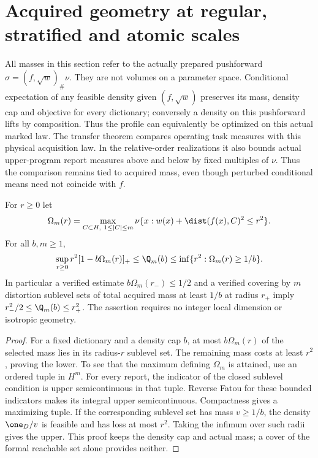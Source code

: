 \section{Acquired geometry at regular, stratified and atomic scales}\label{sec:geometry}
All masses in this section refer to the actually prepared pushforward
$\sigma=(f,\sqrt w)_\#\nu$. They are not volumes on a parameter space. Conditional expectation of any feasible density given $(f,\sqrt w)$ preserves its mass, density cap and objective for every dictionary; conversely a density on this pushforward lifts by composition. Thus the profile can equivalently be optimized on this actual marked law. The transfer theorem compares operating task measures with this physical acquisition law. In the relative-order realizations it also bounds actual upper-program report measures above and below by fixed multiples of $\nu$. Thus the comparison remains tied to acquired mass, even though perturbed conditional means need not coincide with $f$.

\begin{proposition}\label{prop:sublevel}
For $r\ge0$ let
\[
 \Omega_m(r)=\max_{C\subset H,\ 1\le|C|\le m}
       \nu\{x:w(x)+\dist(f(x),C)^2\le r^2\}.
\]
For all $b,m\ge1$,
\begin{equation}\label{eq:sublevel-bounds}
 \sup_{r\ge0}r^2[1-b\Omega_m(r)]_+
 \le\Q_m(b)
 \le\inf\{r^2:\Omega_m(r)\ge1/b\}.
\end{equation}
In particular a verified estimate $b\Omega_m(r_-)\le1/2$ and a verified covering by $m$ distortion sublevel sets of total acquired mass at least $1/b$ at radius $r_+$ imply $r_-^2/2\le\Q_m(b)\le r_+^2$. The assertion requires no integer local dimension or isotropic geometry.
\end{proposition}
\begin{proof}
For a fixed dictionary and a density cap $b$, at most $b\Omega_m(r)$ of the selected mass lies in its radius-$r$ sublevel set. The remaining mass costs at least $r^2$, proving the lower. To see that the maximum defining $\Omega_m$ is attained, use an ordered tuple in $H^m$. For every report, the indicator of the closed sublevel condition is upper semicontinuous in that tuple. Reverse Fatou for these bounded indicators makes its integral upper semicontinuous. Compactness gives a maximizing tuple. If the corresponding sublevel set has mass $v\ge1/b$, the density $\one_D/v$ is feasible and has loss at most $r^2$. Taking the infimum over such radii gives the upper. This proof keeps the density cap and actual mass; a cover of the formal reachable set alone provides neither.
\end{proof}

